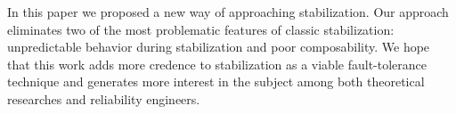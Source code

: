 \documentclass[11pt]{llncs}
\begin{document}
In this paper we proposed a new way of approaching stabilization. Our
approach eliminates two of the most problematic features of classic
stabilization: unpredictable behavior during stabilization and poor
composability. We hope that this work adds more credence to
stabilization as a viable fault-tolerance technique and generates more
interest in the subject among both theoretical researches and
reliability engineers.





 
\end{document}
